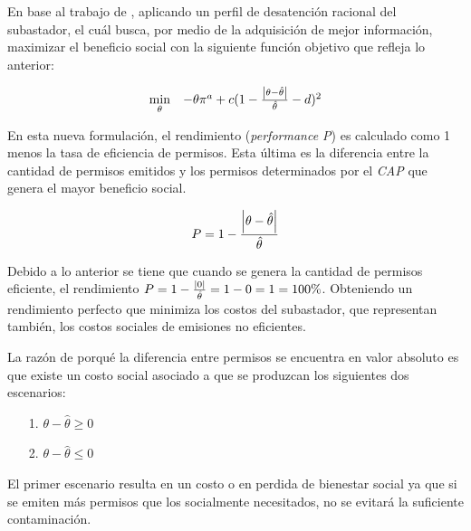 En base al trabajo de , aplicando un perfil de desatención racional del subastador, el cuál busca, por medio de la adquisición de mejor información, maximizar el beneficio social con la siguiente función objetivo que refleja lo anterior:
\vspace{2.5mm}

\begin{equation}
\begin{array}{rrclcl}
\displaystyle \min_{\theta} & -\theta \pi^a + c(1-\frac{\abs{\theta - \hat{\theta}}}{\hat{\theta}}-d)^2 \\
\end{array}
\end{equation}

En esta nueva formulación, el rendimiento (\textit{performance P}) es calculado como 1 menos la tasa de eficiencia de permisos. Esta última es la diferencia entre la cantidad de permisos emitidos y los permisos determinados por el \textit{CAP} que genera el mayor beneficio social. 

\begin{equation}
\begin{array}{rrclcl}
\displaystyle P = 1- \frac{\abs{\theta - \hat{\theta}}}{\hat{\theta}} \\
\end{array}
\end{equation}


Debido a lo anterior se tiene que cuando se genera la cantidad de permisos eficiente, el rendimiento  $P = 1 - \frac{\abs{0}}{\hat{\theta}}= 1 - 0 = 1 =100\%$. Obteniendo un rendimiento perfecto que minimiza los costos del subastador, que representan también, los costos sociales de emisiones no eficientes.
\vspace{2.5mm}

La razón de porqué la diferencia entre permisos se encuentra en valor absoluto es que existe un costo social asociado a que se produzcan los siguientes dos escenarios:

\begin{enumerate}
    \item[1.] $\theta - \hat{\theta} \geq 0$
    \item[2.] $\theta - \hat{\theta} \leq 0$
\end{enumerate}

El primer escenario resulta en un costo o en perdida de bienestar social ya que si se emiten más permisos que los socialmente necesitados, no se evitará la suficiente contaminación. 
\vspace{2.5mm}

